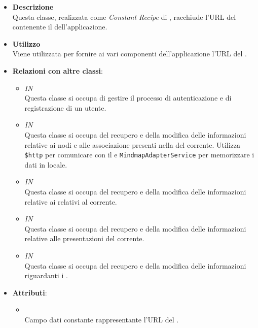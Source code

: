 \FloatBarrier
\begin{itemize}
\item \textbf{Descrizione}\\
Questa classe, realizzata come \textit{Constant Recipe} di , racchiude l'URL del  contenente il  dell'applicazione.
\item \textbf{Utilizzo}\\
Viene utilizzata per fornire ai vari componenti dell'applicazione l'URL del .
\item \textbf{Relazioni con altre classi}:
\begin{itemize}
\item \textit{IN} \hyperref[\nogloxy{Premi::Front-End::Services::AuthenticationService}]{}\\
Questa classe si occupa di gestire il processo di autenticazione e di registrazione di un utente.
\item \textit{IN} \hyperref[\nogloxy{Premi::Front-End::Services::MindmapService}]{}\\
Questa classe si occupa del recupero e della modifica delle informazioni relative ai nodi e alle associazione presenti nella  del  corrente. Utilizza \texttt{\$http} per comunicare con il  e \texttt{MindmapAdapterService} per memorizzare i dati in locale.
\item \textit{IN} \hyperref[\nogloxy{Premi::Front-End::Services::PathService}]{}\\
Questa classe si occupa del recupero e della modifica delle informazioni relative ai  relativi al  corrente.
\item \textit{IN} \hyperref[\nogloxy{Premi::Front-End::Services::PresentationService}]{}\\
Questa classe si occupa del recupero e della modifica delle informazioni relative alle presentazioni del  corrente.
\item \textit{IN} \hyperref[\nogloxy{Premi::Front-End::Services::ProjectService}]{}\\
Questa classe si occupa del recupero e della modifica delle informazioni riguardanti i .
\end{itemize}
\item \textbf{Attributi}:
\begin{itemize}
\item {}
\\ Campo dati constante rappresentante l'URL del .
\end{itemize}
\end{itemize}
